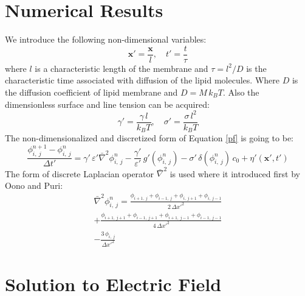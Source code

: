 \documentclass[english,12pt]{article}
\begin{document}
\section{Numerical Results}
We introduce the following non-dimensional variables:
\begin{equation*}
\mathbf{x}'=\frac{\mathbf{x}}{l}, \quad t'=\frac{t}{\tau}
\end{equation*}
where $l$ is a characteristic length of the membrane and $\tau=l^2/D$ is the characteristic time associated with diffusion of the lipid molecules. Where $D$ is the diffusion coefficient of lipid membrane and $D=M\,k_B T$. Also the dimensionless surface and line tension can be acquired:
\begin{equation*}
\gamma'=\frac{\gamma\,l}{k_B T}, \quad \sigma'=\frac{\sigma\,l^2}{k_B T}
\end{equation*}
 The non-dimensionalized and discretized form of Equation \ref{pf} is going to be:
\begin{equation}
	\frac{\phi^{n+1}_{i,\ j}-\phi^{n}_{i,\ j}}{\Delta{t'}}={\gamma'}\,{\varepsilon'}\bar{\nabla}^2\phi^{n}_{i,\ j}-\frac{{\gamma}'}{\varepsilon'}
\,g'(\phi^{n}_{i,\ j})-{\sigma}'\,\delta(\phi^{n}_{i,\ j})\,c_0+{\eta}'(\mathbf{{x'}},{t'})
\end{equation}
The form of discrete Laplacian operator $\bar{\nabla}^2$ is used where it introduced first by Oono and Puri:
\begin{equation}
\begin{split}
\bar{\nabla}^2{\phi^{n}_{i,\ j}}=\frac{\phi_{i+1,\ j}+\phi_{i-1,\ j}+\phi_{i,\ j+1}+\phi_{i,\ j-1}}{2\,{\Delta x'}^{2}}\\
+\frac{\phi_{i+1,\ j+1}+\phi_{i-1,\ j+1}+\phi_{i+1,\ j-1}+\phi_{i-1,\ j-1}}{4\,{\Delta x'}^{2}}\\
-\frac{3\,\phi_{i,\ j}}{{\Delta x'}^2}
\end{split}
\end{equation}

\newpage
\appendix
\section{Solution to Electric Field}

\newpage


\end{document}
